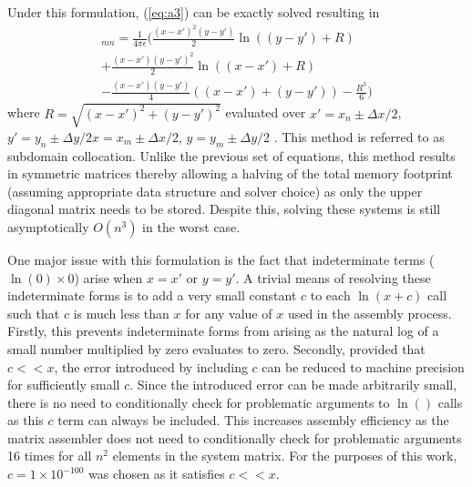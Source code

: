 Under this formulation, (\ref{eq:a3}) can be exactly solved resulting in
\begin{multline}
    [A]_{mn}=\frac{1}{4\pi\epsilon}\Big(\frac{(x-x')^2(y-y')}{2}\ln((y-y')+R) \\ +\frac{(x-x')(y-y')^2}{2}\ln((x-x')+R)\\-\frac{(x-x')(y-y')}{4}((x-x')+(y-y')) -\frac{R^3}{6}\Big)
\end{multline}
where $R=\sqrt{(x-x')^2+(y-y')^2}$ evaluated over $x'=x_n\pm\Delta x / 2$, $y'=y_n\pm\Delta y / 2 x=x_m\pm\Delta x / 2$, $y=y_m\pm\Delta y / 2$ \cite{jin2011theory}. This method is referred to as subdomain collocation. Unlike the previous set of equations, this method results in symmetric matrices thereby allowing a halving of the total memory footprint (assuming appropriate data structure and solver choice) as only the upper diagonal matrix needs to be stored. Despite this, solving these systems is still asymptotically $O(n^3)$ in the worst case.

One major issue with this formulation is the fact that indeterminate terms ($\ln(0)\times 0$) arise when $x=x'$ or $y=y'$. A trivial means of resolving these indeterminate forms is to add a very small constant $c$ to each $\ln(x+c)$ call such that $c$ is much less than $x$ for any value of $x$ used in the assembly process. Firstly, this prevents indeterminate forms from arising as the natural log of a small number multiplied by zero evaluates to zero. Secondly, provided that $c<<x$, the error introduced by including $c$ can be reduced to machine precision for sufficiently small $c$. Since the introduced error can be made arbitrarily small, there is no need to conditionally check for problematic arguments to $\ln()$ calls as this $c$ term can always be included. This increases assembly efficiency as the matrix assembler does not need to conditionally check for problematic arguments 16 times for all $n^2$ elements in the system matrix. For the purposes of this work, $c=1\times10^{-100}$ was chosen as it satisfies $c<<x$.